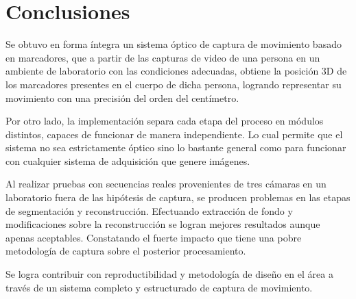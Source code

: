 \section{Conclusiones}

Se obtuvo en forma íntegra un sistema óptico de captura de movimiento basado en marcadores, que a partir de las capturas de video de una persona en un ambiente de laboratorio con las condiciones adecuadas, obtiene la posición 3D de  los marcadores presentes en el cuerpo de dicha persona, logrando representar su movimiento con una precisión del orden del centímetro.
%

Por otro lado, la implementación separa cada etapa del proceso en módulos distintos, capaces de funcionar de manera independiente. Lo cual permite que el sistema no sea estrictamente óptico sino lo bastante general como para funcionar con cualquier sistema de adquisición que genere imágenes. %

Al realizar pruebas con secuencias reales  provenientes de tres cámaras en un laboratorio fuera de las hipótesis de captura, se producen problemas en las etapas de segmentación y reconstrucción. Efectuando extracción de fondo y modificaciones sobre la reconstrucción se logran mejores resultados aunque apenas aceptables. Constatando el fuerte impacto que tiene una pobre metodología de captura sobre el posterior procesamiento.

Se logra contribuir con reproductibilidad y metodología de diseño en el área a través de un sistema completo y estructurado de captura de movimiento.
